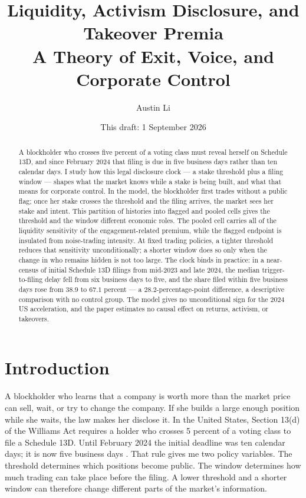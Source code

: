 \documentclass[11pt]{article}
\title{\textbf{Liquidity, Activism Disclosure, and Takeover Premia}\\[0.3em]
\large A Theory of Exit, Voice, and Corporate Control}
\author{Austin Li\\[0.25em]}
\date{This draft: 1 September 2026}
\begin{document}
\maketitle

\begin{abstract}
\noindent A blockholder who crosses five percent of a voting class must reveal herself on Schedule
13D, and since February 2024 that filing is due in five business days rather than ten calendar
days. I study how this legal disclosure clock --- a stake threshold plus a filing window ---
shapes what the market knows while a stake is being built, and what that means for corporate
control. In the model, the blockholder first trades without a public flag; once her stake
crosses the threshold and the filing arrives, the market sees her stake and intent. This
partition of histories into flagged and pooled cells gives the threshold and the window
different economic roles. The pooled cell carries all of the liquidity sensitivity of the
engagement-related premium, while the flagged endpoint is insulated from noise-trading intensity. At fixed
trading policies, a tighter threshold reduces that sensitivity unconditionally; a shorter window
does so only when the change in who remains hidden is not too large. The clock binds in
practice: in a near-census of initial Schedule 13D filings from mid-2023 and late 2024, the
median trigger-to-filing delay fell from six business days to five, and the share filed within
five business days rose from $38.9$ to $67.1$ percent --- a $28.2$-percentage-point difference,
a descriptive comparison with no control
group. The model gives no unconditional sign for the 2024 US acceleration, and the paper
estimates no causal effect on returns, activism, or takeovers.
\end{abstract}

\newpage

\section{Introduction}
\label{sec:intro}

A blockholder who learns that a company is worth more than the market price can sell, wait, or try to
change the company. If she builds a large enough position while she waits, the law makes her disclose
it. In the United States, Section 13(d) of the Williams Act requires a holder who crosses 5 percent
of a voting class to file a Schedule 13D. Until February 2024 the initial deadline was ten calendar
days; it is now five business days \citep{SEC2023}. That rule gives me two policy variables. The
threshold determines which positions become public. The window determines how much trading can take
place before the filing. A lower threshold and a shorter window can therefore change different parts
of the market's information.
\end{document}
